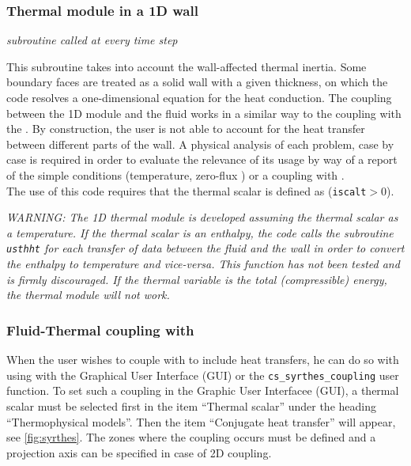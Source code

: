 {{{\subsubsection{Thermal module in a 1D wall}

\noindent
\textit{subroutine called at every time step}

This subroutine takes into account the wall-affected thermal inertia.
 Some boundary faces are treated as a solid wall with a given thickness, on
 which the code resolves a one-dimensional equation for the heat conduction.
 The coupling between the 1D module and the fluid works in a similar way to
 the coupling with the \syrthes. By construction, the user is not able to
 account for the heat transfer between different parts of the wall. A physical
 analysis of each problem, case by case is required in order to evaluate the relevance
 of its usage by way of a report of the simple conditions (temperature, zero-flux
 ) or a coupling with \syrthes.\\

The use of this code requires that the thermal scalar is
defined as (\texttt{iscalt}$>0$).

{\em WARNING: The 1D thermal module is developed assuming the thermal scalar
 as a temperature. If the thermal scalar is an enthalpy, the code calls the
 subroutine \texttt{usthht} for each transfer of data between the fluid
 and the wall in order to convert the enthalpy to temperature and vice-versa.
 This function has not been tested and is firmly discouraged. If the thermal
 variable is the total (compressible) energy, the thermal module will not work.}

\subsubsection{Fluid-Thermal coupling with \syrthes}
When the user wishes to couple \CS with \syrthes to include heat transfers, he can do so with using with the Graphical User Interface (GUI) or the
\texttt{cs\_syrthes\_coupling} user function.
To set such a coupling in the Graphic User Interfacee (GUI), a thermal scalar must be
selected first in the item ``Thermal scalar'' under the heading ``Thermophysical models''.
Then the item ``Conjugate heat transfer'' will appear, see \figurename\ref{fig:syrthes}.
The zones where the coupling occurs must be defined and a projection axis can be
specified in case of 2D coupling.

}}}
